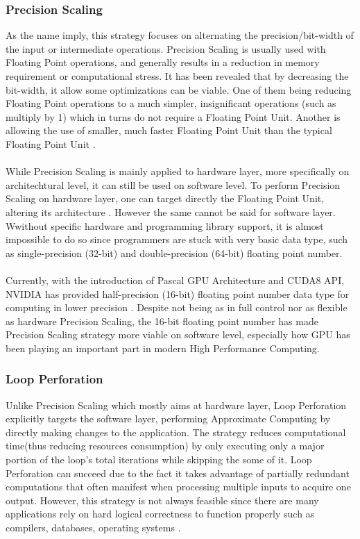 \subsubsection{Precision Scaling}
As the name imply, this strategy focuses on alternating the precision/bit-width of the input or intermediate operations. Precision Scaling is usually used with Floating Point operations, and generally results in a reduction in memory requirement or computational stress. It has been revealed that by decreasing the bit-width, it allow some optimizations can be viable. One of them being reducing Floating Point operations to a much simpler, insignificant operations (such as multiply by 1) which in turns do not require a Floating Point Unit. Another is allowing the use of smaller, much faster Floating Point Unit than the typical Floating Point Unit \cite{4408271}. \\
~\\
While Precision Scaling is mainly applied to hardware layer, more specifically on architechtural level, it can still be used on software level. To perform Precision Scaling on hardware layer, one can target directly the Floating Point Unit, altering its architecture \cite{AxCSurvey}. However the same cannot be said for software layer. Wwithout specific hardware and programming library support, it is almost impossible to do so since programmers are stuck with very basic data type, such as single-precision (32-bit) and double-precision (64-bit) floating point number. \\
~\\
Currently, with the introduction of Pascal GPU Architecture and CUDA8 API, NVIDIA has provided half-precision (16-bit) floating point number data type for computing in lower precision \cite{CUDA8}. Despite not being as in full control nor as flexible as hardware Precision Scaling, the 16-bit floating point number has made Precision Scaling strategy more viable on software level, especially how GPU has been playing an important part in modern High Performance Computing. \\

\subsubsection{Loop Perforation}
Unlike Precision Scaling which mostly aims at hardware layer, Loop Perforation explicitly targets the software layer, performing Approximate Computing by directly making changes to the application. The strategy reduces computational time(thus reducing resources consumption) by only executing only a major portion of the loop's total iterations while skipping the some of it. Loop Perforation can succeed due to the fact it takes advantage of partially redundant computations that often manifest when processing multiple inputs to acquire one output. However, this strategy is not always feasible since there are many applications rely on hard logical correctness to function properly such as compilers, databases, operating systems \cite{LoopPerforation}. \\

